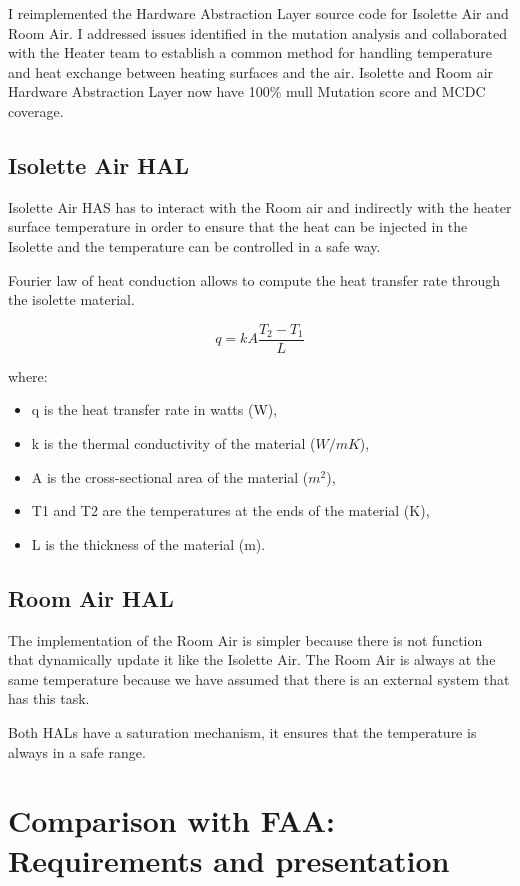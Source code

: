 \documentclass[a4paper, 12pt]{article}
\begin{document}
I reimplemented the Hardware Abstraction Layer source code for Isolette Air and Room Air. I addressed issues identified in the mutation analysis and collaborated with the Heater team to establish a common method for handling temperature and heat exchange between heating surfaces and the air.
Isolette and Room air Hardware Abstraction Layer now have 100\% mull Mutation score and MCDC coverage.

\subsection{Isolette Air HAL}

Isolette Air HAS has to interact with the Room air and indirectly with the heater surface temperature in order to ensure
that the heat can be injected in the Isolette and the temperature can be controlled in a safe way.

Fourier law of heat conduction allows to compute the heat transfer rate through the isolette material.

\begin{equation}
q = k A \frac{T_2 - T_1}{L}
\end{equation}

where:
\begin{itemize}
    \item q is the heat transfer rate in watts (W),
    \item k is the thermal conductivity of the material (\( W/mK \)),
    \item A is the cross-sectional area of the material (\( m^2 \)),
    \item T1 and T2 are the temperatures at the ends of the material (K),
    \item L is the thickness of the material (m).
\end{itemize}

\subsection{Room Air HAL}

The implementation of the Room Air is simpler because there is not function that dynamically update it like the Isolette Air.
The Room Air is always at the same temperature because we have assumed that there is an external system that has this task.

Both HALs have a saturation mechanism, it ensures that the temperature is always in a safe range.

\section{Comparison with FAA: Requirements and presentation}
\end{document}
